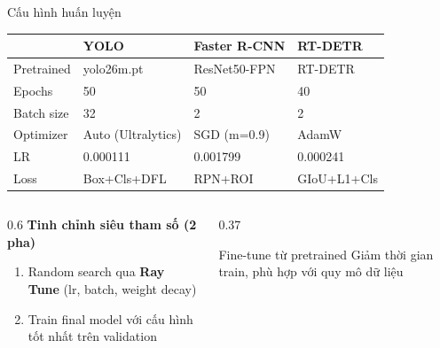 \begin{frame}{Cấu hình huấn luyện}

\begin{table}
\scriptsize
\begin{tabular}{l l l l}
  \toprule
  & \textbf{YOLO} & \textbf{Faster R-CNN} & \textbf{RT-DETR} \\
  \midrule
  Pretrained  & yolo26m.pt       & ResNet50-FPN   & RT-DETR      \\
  Epochs      & 50               & 50             & 40           \\
  Batch size  & 32               & 2              & 2            \\
  Optimizer   & Auto (Ultralytics) & SGD (m=0.9)  & AdamW        \\
  LR          & 0.000111         & 0.001799       & 0.000241     \\
  Loss        & Box+Cls+DFL      & RPN+ROI        & GIoU+L1+Cls  \\
  \bottomrule
\end{tabular}
\end{table}

\vspace{0.4em}
\begin{columns}[T]
\begin{column}{0.6\textwidth}
  \textbf{Tinh chỉnh siêu tham số (2 pha)}
  \begin{enumerate}
    \item Random search qua \textbf{Ray Tune} (lr, batch, weight decay)
    \item Train final model với cấu hình tốt nhất trên validation
  \end{enumerate}
\end{column}
\begin{column}{0.37\textwidth}
  \begin{block}{Fine-tune từ pretrained}
    Giảm thời gian train, phù hợp với quy mô dữ liệu
  \end{block}
\end{column}
\end{columns}

\end{frame}
